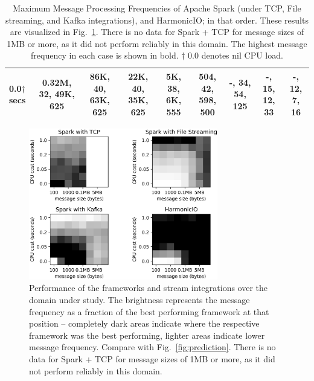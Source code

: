 \documentclass[letterpaper,conference]{IEEEtran}
\begin{document}
\begin{table}
\begin{center}
\begin{tabular}{|l||c|c|c|c|c|c|c|c|}
0.0$\dagger$ secs  & \textbf{0.32M}, 32, 49K, 625 & \textbf{86K}, 40, 63K, 625 & 22K, 40, \textbf{35K}, 625 & 5K, 38, \textbf{6K}, 555 & 504, 42, \textbf{598}, 500 & -, 34, 54, \textbf{125} & -, 15, 12, \textbf{33} & -, 12, 7, \textbf{16} \\
\hline

\end{tabular}
\end{center}
\caption{Maximum Message Processing Frequencies of Apache Spark (under TCP, File streaming, and Kafka integrations), and HarmonicIO; in that order. These results are visualized in Fig.~\ref{fig:blackblobs}. There is no data for Spark + TCP for message sizes of 1MB or more, as it did not perform reliably in this domain. The highest message frequency in each case is shown in bold. $\dagger$ 0.0 denotes nil CPU load.}
\label{table:results}
\end{table}

\begin{figure}[h]
\begin{center}
\includegraphics[width=8.25cm]{images/4-greyscales.png}
\end{center}
\caption{Performance of the frameworks and stream integrations over the domain under study. 
The brightness represents the message frequency as a fraction of the best performing framework at that position --
completely dark areas indicate where the respective framework was the best performing, lighter areas indicate lower message frequency. Compare with Fig.~\ref{fig:prediction}. There is no data for Spark + TCP for message sizes of 1MB or more, as it did not perform reliably in this domain.}
\label{fig:blackblobs}
\end{figure}
\end{document}
